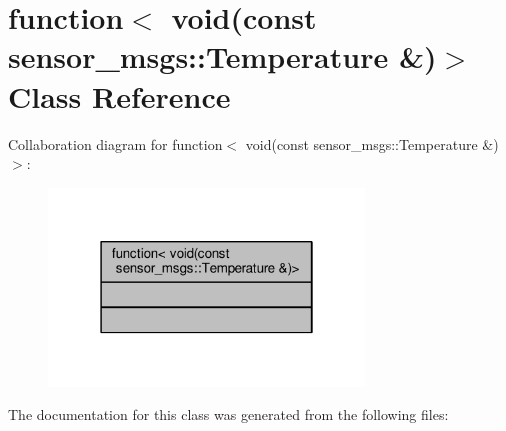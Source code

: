 \hypertarget{classstd_1_1function_3_01void_07const_01sensor__msgs_1_1Temperature_01_6_08_4}{}\section{function$<$ void(const sensor\+\_\+msgs\+:\+:Temperature \&)$>$ Class Reference}
\label{classstd_1_1function_3_01void_07const_01sensor__msgs_1_1Temperature_01_6_08_4}


Collaboration diagram for function$<$ void(const sensor\+\_\+msgs\+:\+:Temperature \&)$>$\+:\nopagebreak
\begin{figure}[H]
\begin{center}
\leavevmode
\includegraphics[width=238pt]{classstd_1_1function_3_01void_07const_01sensor__msgs_1_1Temperature_01_6_08_4__coll__graph}
\end{center}
\end{figure}


The documentation for this class was generated from the following files\+: